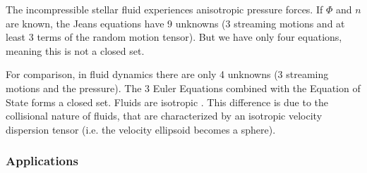 \par The incompressible stellar fluid experiences anisotropic pressure forces. If $\Phi$ and $n$ are known, the Jeans equations have 9 unknowns (3 streaming motions and at least 3 terms of the random motion tensor). But we have only four equations, meaning this is not a closed set.
\par For comparison, in fluid dynamics there are only 4 unknowns (3 streaming motions and the pressure). The 3 Euler Equations combined with the Equation of State forms a closed set. Fluids are isotropic . This difference is due to the collisional nature of fluids, that are characterized by an isotropic velocity dispersion tensor (i.e. the velocity ellipsoid becomes a sphere).

\subsubsection*{Applications}

